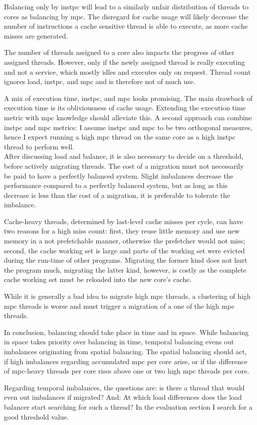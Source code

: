 Balancing only by \gls{instpc} will lead to a similarly unfair distribution of
threads to cores as balancing by \gls{mpc}.
The disregard for cache usage will likely decrease the number of instructions
a cache sensitive thread is able to execute, as more cache misses are
generated.

The number of threads assigned to a core also impacts the progress of other
assigned threads.
However, only if the newly assigned thread is really executing and not a service,
which mostly idles and executes only on request.
Thread count ignores load, \gls{instpc}, and \gls{mpc} and is therefore
not of much use.

A mix of execution time, \gls{instpc}, and \gls{mpc} looks promising.
The main drawback of execution time is its obliviousness of cache usage.
Extending the execution time metric with \gls{mpc} knowledge should alleviate this.
A second approach can combine \gls{instpc} and \gls{mpc} metrics: I assume
\gls{instpc} and \gls{mpc} to be two orthogonal measures, hence I expect running a
high \gls{mpc} thread on the same core as a high \gls{instpc} thread to perform
well.
\\


After discussing load and balance, it is also necessary to decide on a
threshold, before actively migrating threads.
The cost of a migration must not necessarily be paid to have a perfectly
balanced system.
Slight imbalances decrease the performance compared to a perfectly balanced
system, but as long as this decrease is less than the cost of a migration,
it is preferable to tolerate the imbalance.

Cache-heavy threads, determined by last-level cache misses per cycle, can have
two reasons for a high miss count: first, they reuse little memory and use new
memory in a not prefetchable manner, otherwise the prefetcher would not miss;
second, the cache working set is large and parts of the working set were
evicted during the run-time of other programs.
Migrating the former kind does not hurt the program much, migrating the latter
kind, however, is costly as the complete cache working set must be reloaded
into the new core's cache.

While it is generally a bad idea to migrate high \gls{mpc} threads, a
clustering of high \gls{mpc} threads is worse and must trigger a migration of a
one of the high \gls{mpc} threads.

In conclusion, balancing should take place in time and in space.
While balancing in space takes priority over balancing in time, temporal
balancing evens out imbalances originating from spatial balancing.
The spatial balancing should act, if high imbalances regarding accumulated
\gls{mpc} per core arise, or if the difference of \gls{mpc}-heavy threads per
core rises above one or two high \gls{mpc} threads per core.

Regarding temporal imbalances, the questions are: is there a thread that would
even out imbalances if migrated?
And: At which load differences does the load balancer start searching for such
a thread?
In the evaluation section I search for a good threshold value.
